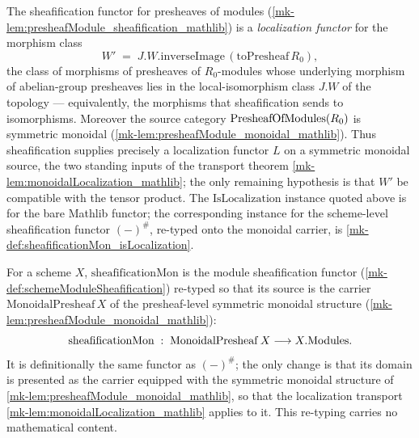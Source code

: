 \begin{lemma}
  \label{mk-lem:moduleSheafification_isLocalization_mathlib}
  \mathlibok

  The sheafification functor for presheaves of modules
  (\ref{mk-lem:presheafModule_sheafification_mathlib}) is a \emph{localization
  functor} for the morphism class
  \[
    W' \;=\; J.W.\mathrm{inverseImage}\,(\mathrm{toPresheaf}\,R_0),
  \]
  the class of morphisms of presheaves of \(R_0\)-modules whose underlying
  morphism of abelian-group presheaves lies in the local-isomorphism class
  \(J.W\) of the topology --- equivalently, the morphisms that sheafification
  sends to isomorphisms. Moreover the source category \(\mathrm{PresheafOfModules}(R_0)\) is
  symmetric monoidal (\ref{mk-lem:presheafModule_monoidal_mathlib}). Thus
  sheafification supplies precisely a localization functor \(L\) on a symmetric
  monoidal source, the two standing inputs of the transport theorem
  \ref{mk-lem:monoidalLocalization_mathlib}; the only remaining hypothesis is that
  \(W'\) be compatible with the tensor product. The \(\mathrm{IsLocalization}\)
  instance quoted above is for the bare Mathlib functor; the corresponding
  instance for the scheme-level sheafification functor
  \(\mathbf{(-)}^{\#}\), re-typed onto the monoidal carrier, is
  \ref{mk-def:sheafificationMon_isLocalization}.
\end{lemma}

\begin{definition}\label{mk-def:sheafificationMon}
  \leanok

  For a scheme \(X\), \(\mathrm{sheafificationMon}\) is the module sheafification
  functor (\ref{mk-def:schemeModuleSheafification}) re-typed so that its source is
  the carrier \(\mathrm{MonoidalPresheaf}\,X\) of the presheaf-level symmetric
  monoidal structure (\ref{mk-lem:presheafModule_monoidal_mathlib}):
  \[
    \mathrm{sheafificationMon} \;:\;
      \mathrm{MonoidalPresheaf}\,X \longrightarrow X.\mathrm{Modules} .
  \]
  It is definitionally the same functor as \((-)^{\#}\); the only change is that
  its domain is presented as the carrier equipped with the symmetric monoidal
  structure of \ref{mk-lem:presheafModule_monoidal_mathlib}, so that the localization
  transport \ref{mk-lem:monoidalLocalization_mathlib} applies to it. This re-typing
  carries no mathematical content.
\end{definition}

